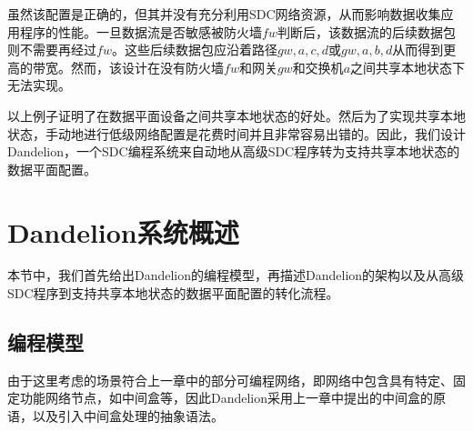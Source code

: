 \documentclass{ctexart}
\begin{document}
虽然该配置是正确的，但其并没有充分利用SDC网络资源，从而影响数据收集应用程序的性能。一旦数据流是否敏感被防火墙$fw$判断后，该数据流的后续数据包则不需要再经过$fw$。这些后续数据包应沿着路径$gw, a, c, d$或$gw, a, b, d$从而得到更高的带宽。然而，该设计在没有防火墙$fw$和网关$gw$和交换机$a$之间共享本地状态下无法实现。


以上例子证明了在数据平面设备之间共享本地状态的好处。然后为了实现共享本地状态，手动地进行低级网络配置是花费时间并且非常容易出错的。因此，我们设计Dandelion，一个SDC编程系统来自动地从高级SDC程序转为支持共享本地状态的数据平面配置。


\section{Dandelion系统概述}

本节中，我们首先给出Dandelion的编程模型，再描述Dandelion的架构以及从高级SDC程序到支持共享本地状态的数据平面配置的转化流程。


\subsection{编程模型}

由于这里考虑的场景符合上一章中的部分可编程网络，即网络中包含具有特定、固定功能网络节点，如中间盒等，因此Dandelion采用上一章中提出的中间盒的原语，以及引入中间盒处理的抽象语法。
\end{document}
